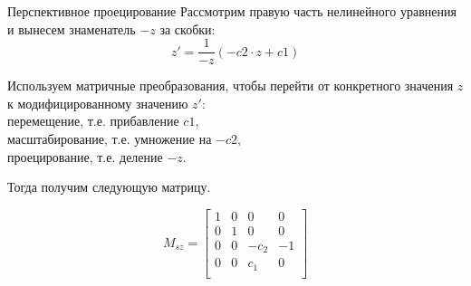 \documentclass{beamer}
\begin{document}
	\begin{frame}{Перспективное проецирование}
	Рассмотрим правую часть нелинейного уравнения и вынесем знаменатель $-z$ за скобки:
		\[
		z' =  \frac{1}{-z} (-c2 \cdot z + c1)
	\]

	Используем матричные преобразования, чтобы перейти от конкретного значения $z$ к модифицированному значению $z'$:\\ 
	перемещение, т.е. прибавление $c1$, \\
	масштабирование, т.е. умножение на $-c2$, \\
	проецирование, т.е. деление $-z$.

	Тогда получим следующую матрицу.


	\[
		M_{sz} = 
	\begin{bmatrix}
		1 & 0 & 0 & 0 \\
		0 & 1 & 0 & 0 \\
		0 & 0 & -c_2 & -1 \\
		0 & 0 & c_1 & 0 \\
	\end{bmatrix}	
	\]

	\note{

	\[
		\begin{bmatrix}
			p_x \\
			p_y \\
			p_z \\
			1		\\
		\end{bmatrix}^T
		\begin{bmatrix}
			1 & 0 & 0 & 0 \\
			0 & 1 & 0 & 0 \\
			0 & 0 & -c_2 & -1 \\
			0 & 0 & c_1 & 0 \\
		\end{bmatrix}
		=
		\begin{bmatrix}
			p_x \\
			p_y \\
			-c_2 p_z + c_1 \\
			-z	\\
		\end{bmatrix}^T
		\]
		\[
			\begin{bmatrix}
				p_x^{*} \\
				p_y^{*} \\
				p_z^{*} \\
				1		\\
			\end{bmatrix}^T
			=
			\begin{bmatrix}
			 p_x / (-z) \\
				p_y / (-z) \\
				(-c_2 p_z + c_1) / (-z) \\
				1	\\
			\end{bmatrix}^T
		\]
	}

\end{frame}
\end{document}
